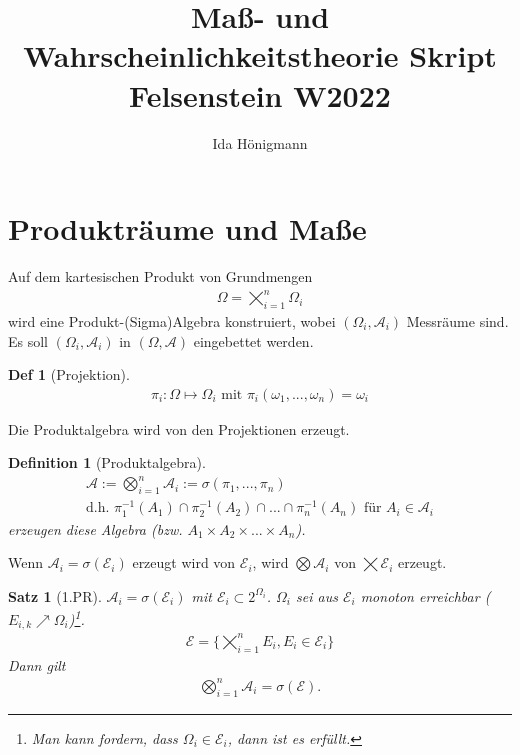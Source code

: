 \documentclass[]{article}
\title{Maß- und Wahrscheinlichkeitstheorie Skript Felsenstein W2022}
\author{Ida Hönigmann}
\newtheorem{theorem}{Satz}
\newtheorem{definition}{Definition}
\newtheorem*{definition*}{Def}
\begin{document}
\maketitle

\section{Produkträume und Maße}
Auf dem kartesischen Produkt von Grundmengen
\begin{align*}
	\Omega = \bigtimes_{i=1}^{n}\Omega_i
\end{align*}
wird eine Produkt-(Sigma)Algebra konstruiert, wobei $(\Omega_i, \mathcal{A}_i)$ Messräume sind. Es soll $(\Omega_i, \mathcal{A}_i)$ in $(\Omega, \mathcal{A})$ eingebettet werden.

\begin{definition*}[Projektion]
	\begin{align*}
		\pi_i : \Omega \mapsto \Omega_i \text{ mit } \pi_i(\omega_1,...,\omega_n)=\omega_i
	\end{align*}
\end{definition*}
Die Produktalgebra wird von den Projektionen erzeugt.

\begin{definition}[Produktalgebra]
	\begin{align*}
		\mathcal{A} := \bigotimes_{i=1}^{n}\mathcal{A}_i := \sigma(\pi_1,...,\pi_n)\\
		\text{d.h. } \pi_1^{-1}(A_1) \cap \pi_2^{-1}(A_2) \cap ... \cap \pi_n^{-1}(A_n) \text{ für } A_i \in \mathcal{A}_i
	\end{align*}
	erzeugen diese Algebra (bzw. $A_1\times A_2\times ...\times A_n$).
\end{definition}

Wenn $\mathcal{A}_i = \sigma(\mathcal{E}_i)$ erzeugt wird von $\mathcal{E}_i$, wird $\bigotimes\mathcal{A}_i$ von $\bigtimes\mathcal{E}_i$ erzeugt.

\begin{theorem}[1.PR]
	$\mathcal{A}_i=\sigma(\mathcal{E}_i)$ mit $\mathcal{E}_i\subset 2^{\Omega_i}$. $\Omega_i$ sei aus $\mathcal{E}_i$ monoton erreichbar ($E_{i,k} \nearrow \Omega_i$)\footnote{Man kann fordern, dass $\Omega_i \in \mathcal{E}_i$, dann ist es erfüllt.}.
	\begin{align*}
		\mathcal{E} = \{\bigtimes_{i=1}^{n}E_i, E_i\in\mathcal{E}_i\}
	\end{align*}
	Dann gilt
	\begin{align*}
		\bigotimes_{i=1}^{n}\mathcal{A}_i = \sigma(\mathcal{E}).
	\end{align*}
\end{theorem}
\end{document}
